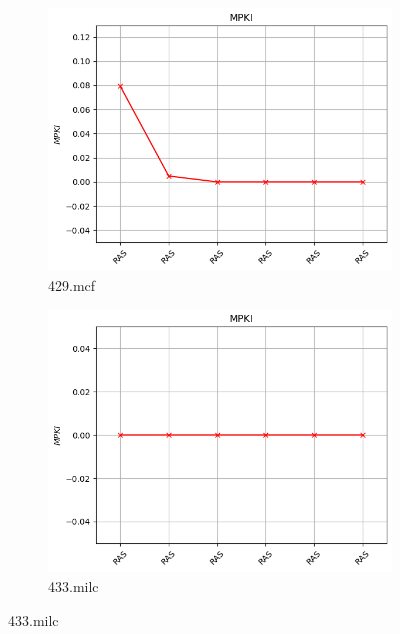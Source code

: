 \documentclass{article}
\begin{document}
\begin{figure}[H]
    \vspace{0.5cm} %

    \begin{subfigure}[b]{0.45\textwidth}
        \includegraphics[width=\textwidth]{figures/5_5/429.mcf.cslab_branch_preds_ref.out.png}
        \caption{429.mcf}
        \label{fig:plot69}
    \end{subfigure}
    \hfill
    \begin{subfigure}[b]{0.45\textwidth}
        \includegraphics[width=\textwidth]{figures/5_5/433.milc.cslab_branch_preds_ref.out.png}
        \caption{433.milc}
        \label{fig:plot70}
    \end{subfigure}


\end{figure}
\end{document}
